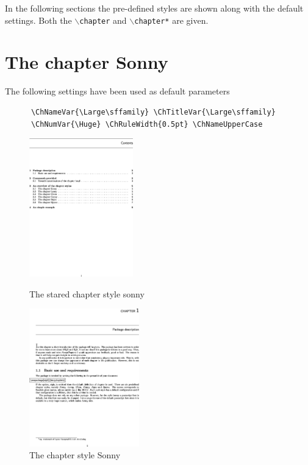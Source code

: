 \documentclass{report}
\newcommand{\A}[1]{{$\backslash${\tt #1}}}
\begin{document}
    In the following sections the pre-defined styles are shown along
    with the default settings. Both the \A{chapter} and \A{chapter*}
    are given.
    \section{The chapter Sonny}
    The following settings have been used as default parameters
    {\small\begin{verbatim}  
      \ChNameVar{\Large\sffamily} \ChTitleVar{\Large\sffamily}
      \ChNumVar{\Huge} \ChRuleWidth{0.5pt} \ChNameUpperCase
    \end{verbatim}}    
    \begin{figure}[h]
      \begin{minipage}{7 cm}
        \label{fig:Sonnys}
        \centerline{\includegraphics[height=6cm]{Sonnys.eps}} 
        \caption{The stared chapter style sonny}
      \end{minipage}\hfill
      \begin{minipage}{7 cm}
        \label{fig:Sonny}
        \centerline{\includegraphics[height=6cm]{Sonny.eps}}
        \caption{The chapter style Sonny}
      \end{minipage}\hfill
    \end{figure}    
    
\end{document}
